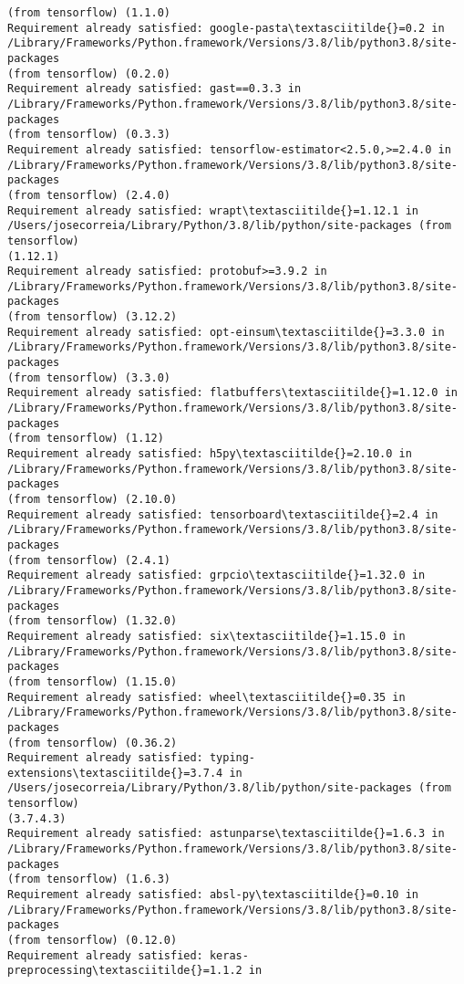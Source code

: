 \documentclass[11pt]{article}
\begin{document}
\begin{Verbatim}[commandchars=\\\{\}]
(from tensorflow) (1.1.0)
Requirement already satisfied: google-pasta\textasciitilde{}=0.2 in
/Library/Frameworks/Python.framework/Versions/3.8/lib/python3.8/site-packages
(from tensorflow) (0.2.0)
Requirement already satisfied: gast==0.3.3 in
/Library/Frameworks/Python.framework/Versions/3.8/lib/python3.8/site-packages
(from tensorflow) (0.3.3)
Requirement already satisfied: tensorflow-estimator<2.5.0,>=2.4.0 in
/Library/Frameworks/Python.framework/Versions/3.8/lib/python3.8/site-packages
(from tensorflow) (2.4.0)
Requirement already satisfied: wrapt\textasciitilde{}=1.12.1 in
/Users/josecorreia/Library/Python/3.8/lib/python/site-packages (from tensorflow)
(1.12.1)
Requirement already satisfied: protobuf>=3.9.2 in
/Library/Frameworks/Python.framework/Versions/3.8/lib/python3.8/site-packages
(from tensorflow) (3.12.2)
Requirement already satisfied: opt-einsum\textasciitilde{}=3.3.0 in
/Library/Frameworks/Python.framework/Versions/3.8/lib/python3.8/site-packages
(from tensorflow) (3.3.0)
Requirement already satisfied: flatbuffers\textasciitilde{}=1.12.0 in
/Library/Frameworks/Python.framework/Versions/3.8/lib/python3.8/site-packages
(from tensorflow) (1.12)
Requirement already satisfied: h5py\textasciitilde{}=2.10.0 in
/Library/Frameworks/Python.framework/Versions/3.8/lib/python3.8/site-packages
(from tensorflow) (2.10.0)
Requirement already satisfied: tensorboard\textasciitilde{}=2.4 in
/Library/Frameworks/Python.framework/Versions/3.8/lib/python3.8/site-packages
(from tensorflow) (2.4.1)
Requirement already satisfied: grpcio\textasciitilde{}=1.32.0 in
/Library/Frameworks/Python.framework/Versions/3.8/lib/python3.8/site-packages
(from tensorflow) (1.32.0)
Requirement already satisfied: six\textasciitilde{}=1.15.0 in
/Library/Frameworks/Python.framework/Versions/3.8/lib/python3.8/site-packages
(from tensorflow) (1.15.0)
Requirement already satisfied: wheel\textasciitilde{}=0.35 in
/Library/Frameworks/Python.framework/Versions/3.8/lib/python3.8/site-packages
(from tensorflow) (0.36.2)
Requirement already satisfied: typing-extensions\textasciitilde{}=3.7.4 in
/Users/josecorreia/Library/Python/3.8/lib/python/site-packages (from tensorflow)
(3.7.4.3)
Requirement already satisfied: astunparse\textasciitilde{}=1.6.3 in
/Library/Frameworks/Python.framework/Versions/3.8/lib/python3.8/site-packages
(from tensorflow) (1.6.3)
Requirement already satisfied: absl-py\textasciitilde{}=0.10 in
/Library/Frameworks/Python.framework/Versions/3.8/lib/python3.8/site-packages
(from tensorflow) (0.12.0)
Requirement already satisfied: keras-preprocessing\textasciitilde{}=1.1.2 in

\end{Verbatim}
\end{document}
